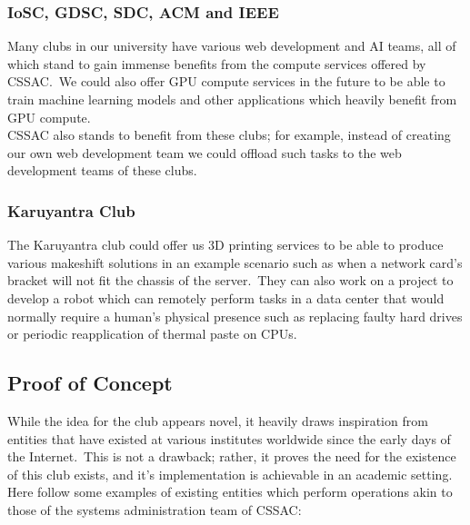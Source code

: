 \subsubsection{IoSC, GDSC, SDC, ACM and IEEE}
Many clubs in our university have various web development and AI teams, all of which stand to gain immense benefits from
the compute services offered by CSSAC.\ We could also offer GPU compute services in the future to be able to train
machine learning models and other applications which heavily benefit from GPU compute.
\\
CSSAC also stands to benefit from these clubs; for example, instead of creating our own web development team we could
offload such tasks to the web development teams of these clubs.

\subsubsection{Karuyantra Club}
The Karuyantra club could offer us 3D printing services to be able to produce various makeshift solutions in an example
scenario such as when a network card's bracket will not fit the chassis of the server.\ They can also work on a project
to develop a robot which can remotely perform tasks in a data center that would normally require a human's physical
presence such as replacing faulty hard drives or periodic reapplication of thermal paste on CPUs.


\subsection{Proof of Concept}\label{subsec:proof-of-concept}

While the idea for the club appears novel, it heavily draws inspiration from entities that have existed at various
institutes worldwide since the early days of the Internet.\ This is not a drawback; rather, it proves the need for the
existence of this club exists, and it's implementation is achievable in an academic setting.
\\
Here follow some examples of existing entities which perform operations akin to those of the systems administration team
of CSSAC:

